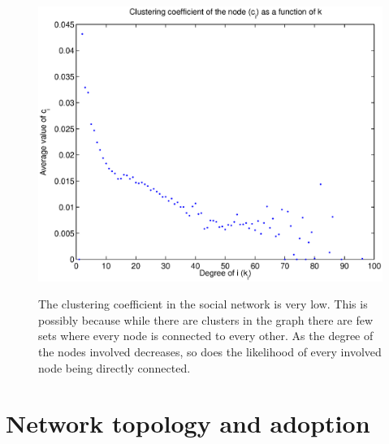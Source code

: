 \documentclass[12pt]{article}
\begin{document}
\begin{figure}[H]
\includegraphics[trim = 0cm 0cm 0cm 0cm, width = .9\textwidth]{Graficos/clusteringcoeff.eps}
\label{fig:cluster}
\caption{The clustering coefficient in the social network is very low. This is possibly because while there are clusters in the graph there are few sets where every node is connected to every other. As the degree of the nodes involved decreases, so does the likelihood of every involved node being directly connected.}
\end{figure}

\section{Network topology and adoption}
\end{document}
